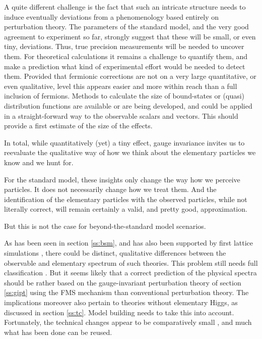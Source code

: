 \documentclass[final,12pt,3p,longtitle]{elsarticle}
\newcommand*{\1}{1\!\!\!\bot}
\begin{document}
A quite different challenge is the fact that such an intricate structure needs to induce eventually deviations from a phenomenology based entirely on perturbation theory. The parameters of the standard model, and the very good agreement to experiment so far, strongly suggest that these will be small, or even tiny, deviations. Thus, true precision measurements will be needed to uncover them. For theoretical calculations it remains a challenge to quantify them, and make a prediction what kind of experimental effort would be needed to detect them. Provided that fermionic corrections are not on a very large quantitative, or even qualitative, level this appears easier and more within reach than a full inclusion of fermions. Methods to calculate the size of bound-states \cite{Koponen:2015tkr,Gockeler:2003ay} or (quasi) distribution functions \cite{Nguyen:2011jy,Lin:2014zya,Chen:2016utp} are available or are being developed, and could be applied in a straight-forward way to the observable scalars and vectors. This should provide a first estimate of the size of the effects.

In total, while quantitatively (yet) a tiny effect, gauge invariance invites us to reevaluate the qualitative way of how we think about the elementary particles we know and we hunt for.

For the standard model, these insights only change the way how we perceive particles. It does not necessarily change how we treat them. And the identification of the elementary particles with the observed particles, while not literally correct, will remain certainly a valid, and pretty good, approximation.

But this is not the case for beyond-the-standard model scenarios.

As has been seen in section \ref{ss:bsm}, and has also been supported by first lattice simulations \cite{Maas:2016ngo,Lee:1985yi}, there could be distinct, qualitative differences between the observable and elementary spectrum of such theories. This problem still needs full classification \cite{Maas:2017xzh}. But it seems likely that a correct prediction of the physical spectra should be rather based on the gauge-invariant perturbation theory of section \ref{ss:gipt} using the FMS mechanism than conventional perturbation theory. The implications moreover also pertain to theories without elementary Higgs, as discussed in section \ref{ss:tc}. Model building needs to take this into account. Fortunately, the technical changes appear to be comparatively small \cite{Maas:2017xzh}, and much what has been done can be reused.
\end{document}
